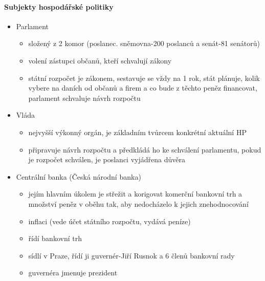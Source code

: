 \paragraph*{Subjekty hospodářské politiky}
\begin{itemize}
    \item Parlament
        \begin{itemize}
            \item složený z 2 komor (poslanec. sněmovna-200 poslanců a senát-81 senátorů)
            \item volení zástupci občanů, kteří schvalují zákony
            \item státní rozpočet je zákonem, sestavuje se vždy na 1 rok, stát plánuje, kolik vybere na daních od občanů a firem a co bude z těchto peněz financovat, parlament schvaluje návrh rozpočtu
        \end{itemize}
    \item Vláda
        \begin{itemize}
            \item nejvyšší výkonný orgán, je základním tvůrcem konkrétní aktuální HP
            \item připravuje návrh rozpočtu a předkládá ho ke schválení parlamentu, pokud je rozpočet schválen, je poslanci vyjádřena důvěra
        \end{itemize}
    \item Centrální banka (Česká národní banka)
        \begin{itemize}
            \item jejím hlavním úkolem je střežit a korigovat komerční bankovní trh a množství peněz v oběhu tak, aby nedocházelo k jejich znehodnocování
            \item inflaci (vede účet státního rozpočtu, vydává peníze)
            \item řídí bankovní trh
            \item sídlí v Praze, řídí ji guvernér-Jiří Rusnok a 6 členů bankovní rady
            \item guvernéra jmenuje prezident
        \end{itemize}
\end{itemize}

